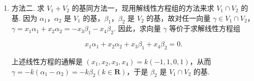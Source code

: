 \documentclass[UTF8,12pt,a4paper,fontset=fandol]{ctexart}
\begin{document}
\begin{solve}
\begin{enumerate}
              所以就可以取 $\alpha_1$，$\alpha_2$，$\beta_1$ 为 $V_1 + V_2$ 的基（不唯一）.

              下面再来取 $V_1\cap V_2$ 的基，首先注意到 $\alpha_1$，$\alpha_2$ 是 $V_1$ 的基（从上面的矩阵即可看出），又不难验证 $\beta_1$，$\beta_2$ 是 $V_2$ 的基，$V_2$ 中的向量可以表示为 $\beta_1$，$\beta_2$ 的线性组合. 假设 $t_1\beta_1 + t_2\beta_2$ 属于 $V_1$，则向量组 $\alpha_1, \alpha_2, t_1\beta_1 + t_2\beta_2$ 和向量组 $\alpha_1, \alpha_2$ 的秩相等（因为 $\alpha_1, \alpha_2$ 是 $V_1$ 的基）. 因此，我们可以用矩阵方法来求出参数 $t_1, t_2$. 注意到
              \[ \begin{pmatrix}
                      1  & 0 & -t + t_2   \\
                      0  & 1 & t_1 - t_2  \\
                      -1 & 2 & t_1 - 3t_2 \\
                      0  & 1 & -t_1 - t_2
                  \end{pmatrix} \xrightarrow{} \begin{pmatrix}
                      1 & 0 & -t + t_2  \\
                      0 & 1 & t_1 - t_2 \\
                      0 & 2 & -2t_2     \\
                      0 & 0 & 0
                  \end{pmatrix} \xrightarrow{} \begin{pmatrix}
                      1 & 0 & -t + t_2  \\
                      0 & 1 & t_1 - t_2 \\
                      0 & 0 & -2t_1     \\
                      0 & 0 & 0
                  \end{pmatrix} \]

              所以可以得出当且仅当 $t_1 = 0$ 时 $t_1\beta_1 + t_2\beta_2$ 属于 $V_1$，所以 $V_1 \cap V_2$ 的基可取为 $\beta_2$.

        \item 方法二. 求 $V_1 + V_2$ 的基同方法一，现用解线性方程组的方法来求 $V_1 \cap V_2$ 的基. 因为 $\alpha_1$，$\alpha_2$ 是 $V_1$ 的基，$\beta_1$，$\beta_2$ 是 $V_2$ 的基，故对任一向量 $\gamma \in V_1 \cap V_2$，$\gamma = x_1\alpha_1 + x_2\alpha_2 = -x_3\beta_1 - x_4\beta_2$. 因此，求向量 $\gamma$ 等价于求解线性方程组

              \[ x_1\alpha_1 + x_2\alpha_2 + x_3\beta_1 + x_4\beta_2 = 0. \]

              上述线性方程的通解是 $(x_1, x_2, x_3, x_4) = k(-1, 1, 0, 1)$，从而 $\gamma = -k(\alpha_1 - \alpha_2) = -k\beta_2 (k \in \mathbf{R})$，于是 $\beta_2$ 是 $V_1 \cap V_2$ 的基.
    \end{enumerate}
\end{solve}
\end{document}

